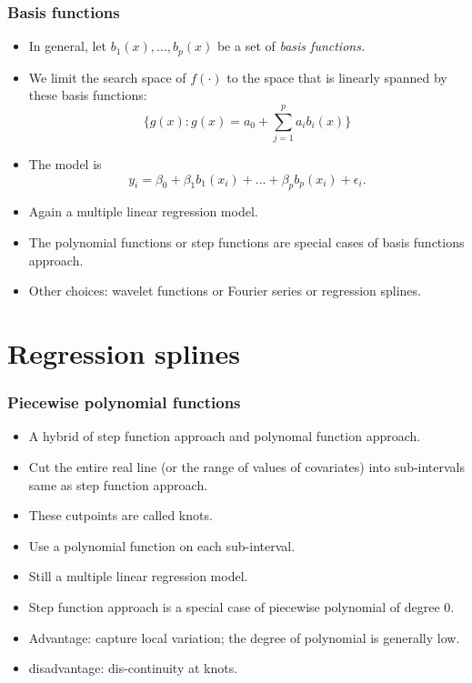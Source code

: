 \documentclass{beamer}
\begin{document}
              
              \begin{frame}
              	\frametitle{ Basis functions}
              	\begin{itemize}
              		\item In general, let $b_1(x),..., b_p(x)$ be a set of  {\it  basis functions.}
              		\item We limit the search space of $f(\cdot)$ to the space that is linearly spanned by
              		these basis functions:
              		$$ \{ g(x): g(x)= a_0 +  \sum_{j=1}^p a_i b_i(x) \}$$
              		\item The model is 
              		$$ y_i = \beta_0 + \beta_1 b_1(x_i) + ... + \beta_p b_p(x_i) + \epsilon_i.$$
              		
              		\item Again a multiple linear regression model. 
              		\item The polynomial functions or step functions are special cases of basis functions approach.
              		\item Other choices: wavelet functions or Fourier series or regression splines.
              	\end{itemize}
              \end{frame} 
\section{Regression splines}

  \begin{frame}
  	\frametitle{ Piecewise polynomial functions}
  	\begin{itemize}
  		\item A hybrid of step function approach and polynomal function approach.
  		\item Cut the entire real line (or the range of values of covariates) into sub-intervals same as
  		step function approach.
  		\item These cutpoints are called knots. 
  		\item Use a polynomial function   on each sub-interval.
  		\item Still a multiple linear regression model.
  		
  		\item Step function approach is a special case of piecewise polynomial of degree $0$.
  		
  		\item Advantage: capture local variation; the degree of polynomial is generally low.
  		\item disadvantage: dis-continuity at knots.
  	 
  	\end{itemize}
  \end{frame} 
  
\end{document}
